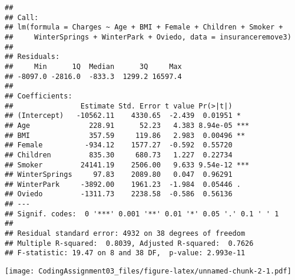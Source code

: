 \documentclass[
]{article}
\newenvironment{Shaded}{\begin{snugshade}}{\end{snugshade}}
\newcommand{\AttributeTok}[1]{\textcolor[rgb]{0.77,0.63,0.00}{#1}}
\newcommand{\CommentTok}[1]{\textcolor[rgb]{0.56,0.35,0.01}{\textit{#1}}}
\newcommand{\DecValTok}[1]{\textcolor[rgb]{0.00,0.00,0.81}{#1}}
\newcommand{\FunctionTok}[1]{\textcolor[rgb]{0.00,0.00,0.00}{#1}}
\newcommand{\NormalTok}[1]{#1}
\newcommand{\OtherTok}[1]{\textcolor[rgb]{0.56,0.35,0.01}{#1}}
\newcommand{\SpecialCharTok}[1]{\textcolor[rgb]{0.00,0.00,0.00}{#1}}
\begin{document}
\begin{verbatim}
## 
## Call:
## lm(formula = Charges ~ Age + BMI + Female + Children + Smoker + 
##     WinterSprings + WinterPark + Oviedo, data = insuranceremove3)
## 
## Residuals:
##     Min      1Q  Median      3Q     Max 
## -8097.0 -2816.0  -833.3  1299.2 16597.4 
## 
## Coefficients:
##                Estimate Std. Error t value Pr(>|t|)    
## (Intercept)   -10562.11    4330.65  -2.439  0.01951 *  
## Age              228.91      52.23   4.383 8.94e-05 ***
## BMI              357.59     119.86   2.983  0.00496 ** 
## Female          -934.12    1577.27  -0.592  0.55720    
## Children         835.30     680.73   1.227  0.22734    
## Smoker         24141.19    2506.00   9.633 9.54e-12 ***
## WinterSprings     97.83    2089.80   0.047  0.96291    
## WinterPark     -3892.00    1961.23  -1.984  0.05446 .  
## Oviedo         -1311.73    2238.58  -0.586  0.56136    
## ---
## Signif. codes:  0 '***' 0.001 '**' 0.01 '*' 0.05 '.' 0.1 ' ' 1
## 
## Residual standard error: 4932 on 38 degrees of freedom
## Multiple R-squared:  0.8039, Adjusted R-squared:  0.7626 
## F-statistic: 19.47 on 8 and 38 DF,  p-value: 2.993e-11
\end{verbatim}

\begin{Shaded}
\end{Shaded}

\texttt{[image: CodingAssignment03\_files/figure-latex/unnamed-chunk-2-1.pdf]}

\begin{Shaded}
\end{Shaded}
\end{document}
